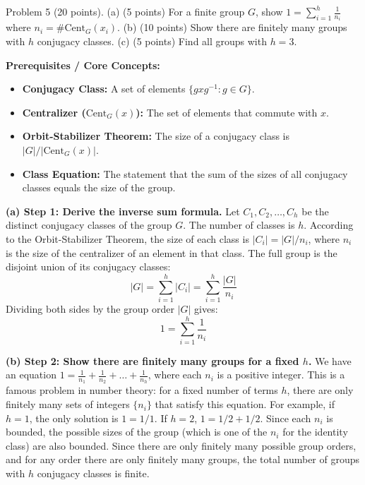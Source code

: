 \begin{exercise}
\label{algebra:2016:10}
Problem 5 (20 points).
(a) (5 points) For a finite group $G$, show $1 = \sum_{i=1}^h \frac{1}{n_i}$ where $n_i = \#\mathrm{Cent}_G(x_i)$.
(b) (10 points) Show there are finitely many groups with $h$ conjugacy classes.
(c) (5 points) Find all groups with $h=3$.
\end{exercise}
\begin{solution}
\textbf{Prerequisites / Core Concepts:}
\begin{itemize}
    \item \textbf{Conjugacy Class:} A set of elements $\{ g x g^{-1} : g \in G \}$.
    \item \textbf{Centralizer ($\text{Cent}_G(x)$):} The set of elements that commute with $x$.
    \item \textbf{Orbit-Stabilizer Theorem:} The size of a conjugacy class is $|G| / |\text{Cent}_G(x)|$.
    \item \textbf{Class Equation:} The statement that the sum of the sizes of all conjugacy classes equals the size of the group.
\end{itemize}

\textbf{(a) Step 1: Derive the inverse sum formula.}
Let $C_1, C_2, \dots, C_h$ be the distinct conjugacy classes of the group $G$. The number of classes is $h$.
According to the Orbit-Stabilizer Theorem, the size of each class is $|C_i| = |G| / n_i$, where $n_i$ is the size of the centralizer of an element in that class.
The full group is the disjoint union of its conjugacy classes:
\[ |G| = \sum_{i=1}^h |C_i| = \sum_{i=1}^h \frac{|G|}{n_i} \]
Dividing both sides by the group order $|G|$ gives:
\[ 1 = \sum_{i=1}^h \frac{1}{n_i} \]

\textbf{(b) Step 2: Show there are finitely many groups for a fixed $h$.}
We have an equation $1 = \frac{1}{n_1} + \frac{1}{n_2} + \dots + \frac{1}{n_h}$, where each $n_i$ is a positive integer.
This is a famous problem in number theory: for a fixed number of terms $h$, there are only finitely many sets of integers $\{n_i\}$ that satisfy this equation.
For example, if $h=1$, the only solution is $1=1/1$. If $h=2$, $1=1/2+1/2$.
Since each $n_i$ is bounded, the possible sizes of the group (which is one of the $n_i$ for the identity class) are also bounded.
Since there are only finitely many possible group orders, and for any order there are only finitely many groups, the total number of groups with $h$ conjugacy classes is finite.


\end{solution}

